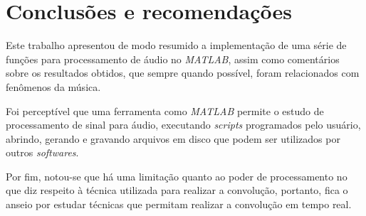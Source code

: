 \section[Conclusões e recomendações]{Conclusões e recomendações}

    Este trabalho apresentou de modo resumido a implementação de uma série de funções para processamento de áudio no \textit{MATLAB}, assim como comentários sobre os resultados obtidos, que sempre quando possível, foram relacionados com fenômenos da música.
    
    Foi perceptível que uma ferramenta como \textit{MATLAB} permite o estudo de processamento de sinal para áudio, executando \textit{scripts} programados pelo usuário, abrindo, gerando e gravando arquivos em disco que podem ser utilizados por outros \textit{softwares}.
    
    Por fim, notou-se que há uma limitação quanto ao poder de processamento no que diz respeito à técnica utilizada para realizar a convolução, portanto, fica o anseio por estudar técnicas que permitam realizar a convolução em tempo real.